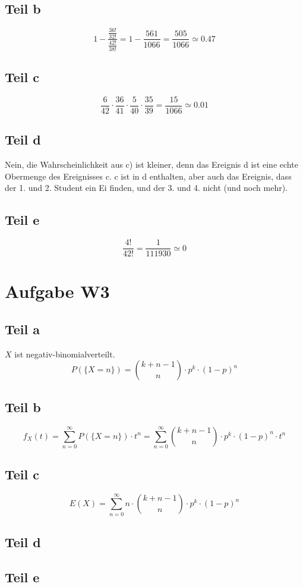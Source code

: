 \documentclass[10pt,a4paper]{article}
\begin{document}
\subsection{Teil b}
\begin{equation}
  1 - \frac{\frac{36!}{32!}}{\frac{42!}{38!}} = 1 - \frac{561}{1066} = \frac{505}{1066} \simeq 0.47
\end{equation}

\subsection{Teil c}
\begin{equation}
  \frac{6}{42} \cdot \frac{36}{41} \cdot \frac{5}{40} \cdot \frac{35}{39} = \frac{15}{1066} \simeq 0.01
\end{equation}

\subsection{Teil d}
Nein, die Wahrscheinlichkeit aus c) ist kleiner, denn das Ereignis d ist eine echte Obermenge des Ereignisses c.
c ist in d enthalten, aber auch das Ereignis, dass der 1. und 2. Student ein Ei finden, und der 3. und 4. nicht (und noch mehr).

\subsection{Teil e}
\begin{equation}
  \frac{4!}{42!} = \frac{1}{111930} \simeq 0
\end{equation}

\section{Aufgabe W3}

\subsection{Teil a}
$X$ ist negativ-binomialverteilt.
\begin{equation}
  P(\{ X = n \}) = \binom{k + n - 1}{n} \cdot p^{k} \cdot (1 - p)^{n}
\end{equation}

\subsection{Teil b}
\begin{equation}
  f_{X}(t) = \sum_{n = 0}^{\infty} P(\{ X = n \}) \cdot t^{n} = \sum_{n = 0}^{\infty} \binom{k + n - 1}{n} \cdot p^{k} \cdot (1 - p)^{n} \cdot t^{n}
\end{equation}

\subsection{Teil c}
\begin{equation}
  E(X) = \sum_{n = 0}^{\infty} n \cdot \binom{k + n - 1}{n} \cdot p^{k} \cdot (1 - p)^{n}
\end{equation}

\subsection{Teil d}

\subsection{Teil e}
\end{document}
